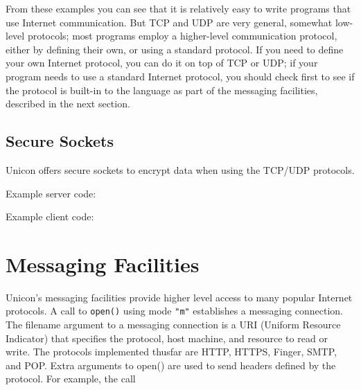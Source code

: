 From these examples you can see that it is relatively easy to write
programs that use Internet communication. But TCP and UDP are very
general, somewhat low-level protocols; most programs employ a
higher-level communication protocol, either by defining their own, or
using a standard protocol. If you need to define your own Internet
protocol, you can do it on top of TCP or UDP; if your program needs to
use a standard Internet protocol, you should check first to see if the
protocol is built-in to the language as part of the messaging
facilities, described in the next section.

\subsection*{Secure Sockets}

Unicon offers secure sockets to encrypt data when using the TCP/UDP protocols.

Example server code:

Example client code:

\section{Messaging Facilities}

Unicon's messaging facilities provide
higher level access to many popular Internet protocols. A call to
\texttt{open()} using mode \texttt{"m"}
establishes a messaging connection. The filename argument to a
messaging connection is a URI (Uniform Resource Indicator) that
specifies the protocol, host machine, and resource to read or write.
The protocols implemented thusfar are HTTP, HTTPS, Finger, SMTP, and POP.
Extra arguments to open() are used to send headers defined by the
protocol. For example, the call

